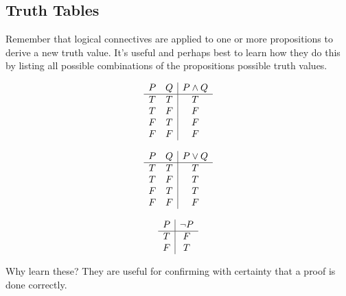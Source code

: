 \documentclass[12pt,letterpaper]{article}
\begin{document}
\subsection{Truth Tables}
Remember that logical connectives are applied to one or more propositions to derive a new truth value.  It's useful and perhaps best to learn how they do this by listing all possible combinations of the propositions possible truth values.

\begin{displaymath}
\begin{array}{c c|c}
P & Q & P \land Q\\ 
\hline 
T & T & T\\
T & F & F\\
F & T & F\\
F & F & F\\
\end{array}
\end{displaymath}

\begin{displaymath}
\begin{array}{c c|c}
P & Q & P \lor Q\\ 
\hline 
T & T & T\\
T & F & T\\
F & T & T\\
F & F & F\\
\end{array}
\end{displaymath}

\begin{displaymath}
\begin{array}{c| c}
P & \neg P \\ 
\hline 
T & F \\
F & T \\
\end{array}
\end{displaymath}

Why learn these?  They are useful for confirming with certainty that a proof is done correctly.


\end{document}
